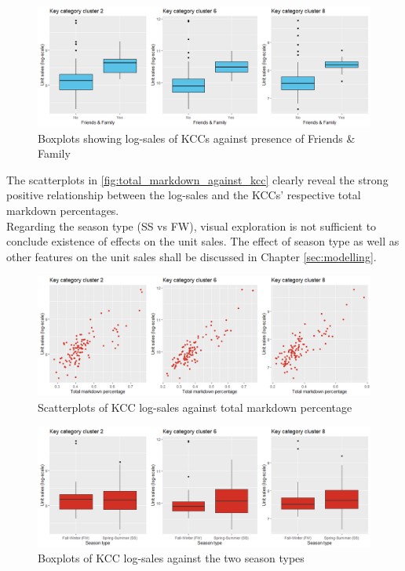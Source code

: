 \begin{figure}[H]
\centering
  \includegraphics[width=0.95\linewidth]{figures/ff_kcc_boxplot.png}
  \caption{Boxplots showing log-sales of KCCs against presence of Friends \& Family}
  \label{fig:ff_kcc_boxplot}
\end{figure}


The scatterplots in \autoref{fig:total_markdown_against_kcc} clearly reveal the strong positive relationship between the log-sales and the \ac{KCC}s' respective total markdown percentages.
\\
Regarding the season type (SS vs FW), visual exploration is not sufficient to conclude existence of effects on the unit sales. The effect of season type as well as other features on the unit sales shall be discussed in Chapter \ref{sec:modelling}.
\\




\begin{figure}[H]
\centering
  \includegraphics[width=0.95\linewidth]{figures/total_markdown_against_kcc.png}
  \caption{Scatterplots of \ac{KCC} log-sales against total markdown percentage}
  \label{fig:total_markdown_against_kcc}
\end{figure}






\begin{figure}[H]
\centering
  \includegraphics[width=0.95\linewidth]{figures/season_type_against_kcc.png}
  \caption{Boxplots of \ac{KCC} log-sales against the two season types}
  \label{fig:season_type_against_kcc}
\end{figure}





